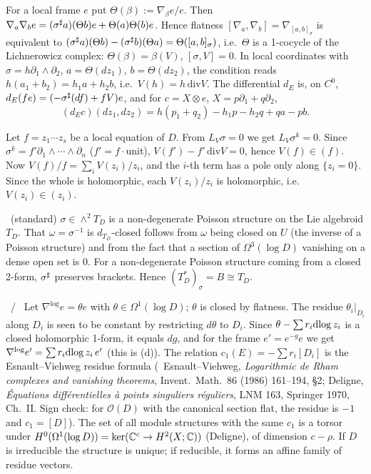 \begin{lem}\tP\label{p1:lem:flat}
For a local frame $e$ put $\Theta(\beta):=\nabla_\beta e/e$. Then $\nabla_a\nabla_be=(\sigma^\sharp a)(\Theta b)e+\Theta(a)\Theta(b)e$. Hence flatness $[\nabla_a,\nabla_b]=\nabla_{[a,b]_\sigma}$ is equivalent to
$(\sigma^\sharp a)(\Theta b)-(\sigma^\sharp b)(\Theta a)=\Theta([a,b]_\sigma)$, i.e.\ $\Theta$ is a 1-cocycle of the Lichnerowicz complex: $\Theta(\beta)=\beta(V)$, $[\sigma,V]=0$.
In local coordinates with $\sigma=h\partial_1\wedge\partial_2$, $a=\Theta(dz_1)$, $b=\Theta(dz_2)$, the condition reads $h(a_1+b_2)=h_1a+h_2b$, i.e.\ $V(h)=h\,\mathrm{div}V$. The differential $d_E$ is, on $C^0$, $d_E(fe)=(-\sigma^\sharp(df)+fV)e$, and for $c=X\otimes e$, $X=p\partial_1+q\partial_2$,
\[(d_Ec)(dz_1,dz_2)=h(p_1+q_2)-h_1p-h_2q+qa-pb.\]
\end{lem}
\begin{lem}[$V$ is logarithmic]\tP\label{p1:lem:log}
Let $f=z_1\cdots z_s$ be a local equation of $D$. From $L_V\sigma=0$ we get $L_V\sigma^k=0$. Since $\sigma^k=f'\partial_1\wedge\cdots\wedge\partial_n$ ($f'=f\cdot$unit), $V(f')-f'\,\mathrm{div}V=0$, hence $V(f)\in(f)$. Now $V(f)/f=\sum_iV(z_i)/z_i$, and the $i$-th term has a pole only along $\{z_i=0\}$. Since the whole is holomorphic, each $V(z_i)/z_i$ is holomorphic, i.e.\ $V(z_i)\in(z_i)$.
\end{lem}
\begin{lem}\tP\ (standard)\label{p1:lem:iso}
$\sigma\in\wedge^2T_D$ is a non-degenerate Poisson structure on the Lie algebroid $T_D$. That $\omega=\sigma^{-1}$ is $d_{T_D}$-closed follows from $\omega$ being closed on $U$ (the inverse of a Poisson structure) and from the fact that a section of $\Omega^3(\log D)$ vanishing on a dense open set is $0$. For a non-degenerate Poisson structure coming from a closed 2-form, $\sigma^\sharp$ preserves brackets. Hence $(T_D^*)_\sigma=B\cong T_D$.
\end{lem}
\begin{lem}\tP\ /\ \tC\label{p1:lem:res}
Let $\nabla^{\log}e=\theta e$ with $\theta\in\Omega^1(\log D)$; $\theta$ is closed by flatness. The residue $\theta_i|_{D_i}$ along $D_i$ is seen to be constant by restricting $d\theta$ to $D_i$. Since $\theta-\sum r_i\mathrm{dlog}\, z_i$ is a closed holomorphic 1-form, it equals $dg$, and for the frame $e'=e^{-g}e$ we get $\nabla^{\log}e'=\sum r_i\mathrm{dlog}\, z_i\,e'$ (this is (d)). The relation $c_1(E)=-\sum r_i[D_i]$ is the Esnault--Viehweg residue formula (\tC\ Esnault--Viehweg, \emph{Logarithmic de Rham complexes and vanishing theorems}, Invent.\ Math.\ 86 (1986) 161--194, \S2; Deligne, \emph{\'Equations diff\'erentielles \`a points singuliers r\'eguliers}, LNM 163, Springer 1970, Ch.~II. Sign check: for $\mathcal O(D)$ with the canonical section flat, the residue is $-1$ and $c_1=[D]$).
The set of all module structures with the same $c_1$ is a torsor under $H^0(\Omega^1(\log D))=\ker(\mathbb C^c\to H^2(X;\mathbb C))$ (Deligne), of dimension $c-\rho$. If $D$ is irreducible the structure is unique; if reducible, it forms an affine family of residue vectors.
\end{lem}
